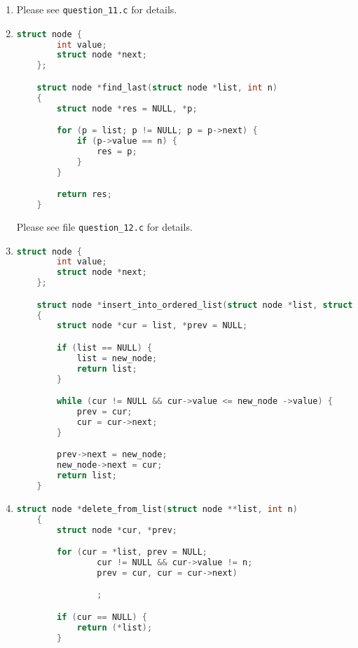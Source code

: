 \documentclass[12pt]{article}
\begin{document}
\begin{enumerate}[1.]
    \item

    Please see \texttt{question\_11.c} for details.

    \item

\begin{lstlisting}[language=c]
    struct node {
        int value;
        struct node *next;
    };

    struct node *find_last(struct node *list, int n)
    {
        struct node *res = NULL, *p;

        for (p = list; p != NULL; p = p->next) {
            if (p->value == n) {
                res = p;
            }
        }

        return res;
    }
\end{lstlisting}

    \bigskip

    Please see file \texttt{question\_12.c} for details.

    \item

\begin{lstlisting}[language=c]
    struct node {
        int value;
        struct node *next;
    };

    struct node *insert_into_ordered_list(struct node *list, struct node *new_node)
    {
        struct node *cur = list, *prev = NULL;

        if (list == NULL) {
            list = new_node;
            return list;
        }

        while (cur != NULL && cur->value <= new_node ->value) {
            prev = cur;
            cur = cur->next;
        }

        prev->next = new_node;
        new_node->next = cur;
        return list;
    }
\end{lstlisting}

    \item

\begin{lstlisting}[language=c]
    struct node *delete_from_list(struct node **list, int n)
    {
        struct node *cur, *prev;

        for (cur = *list, prev = NULL;
                cur != NULL && cur->value != n;
                prev = cur, cur = cur->next)

                ;

        if (cur == NULL) {
            return (*list);
        }


\end{lstlisting}
\end{enumerate}
\end{document}
